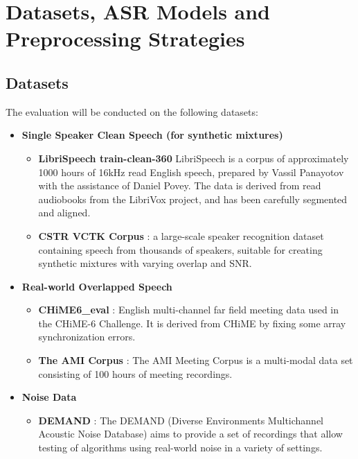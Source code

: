 \chapter{Datasets, ASR Models and Preprocessing Strategies}
\section{Datasets}
\label{sec:dataset}
The evaluation will be conducted on the following datasets:
\begin{itemize}
    \item \textbf{Single Speaker Clean Speech (for synthetic mixtures)} 
    \begin{itemize}
        \item \textbf{LibriSpeech train-clean-360} LibriSpeech is a corpus of approximately 1000 hours of 16kHz read English speech, prepared by Vassil Panayotov with the assistance of Daniel Povey. The data is derived from read audiobooks from the LibriVox project, and has been carefully segmented and aligned. \cite{librispeech}
        \item \textbf{CSTR VCTK Corpus} \cite{voxceleb}: a large-scale speaker recognition dataset containing speech from thousands of speakers, suitable for creating synthetic mixtures with varying overlap and SNR.
    \end{itemize}
    \item \textbf{Real-world Overlapped Speech}
    \begin{itemize}
        \item \textbf{CHiME6\_eval} \cite{chime6}: English multi-channel far field meeting data used in the CHiME-6 Challenge. It is derived from CHiME by fixing some array synchronization errors.
        \item \textbf{The AMI Corpus} \cite{ami-corpus}: The AMI Meeting Corpus is a multi-modal data set consisting of 100 hours of meeting recordings.
    \end{itemize}
    \item \textbf{Noise Data}
    \begin{itemize}
        \item \textbf{DEMAND} \cite{demand}: The DEMAND (Diverse Environments Multichannel Acoustic Noise Database) aims to provide a set of recordings that allow testing of algorithms using real-world noise in a variety of settings.
    \end{itemize}
\end{itemize}

